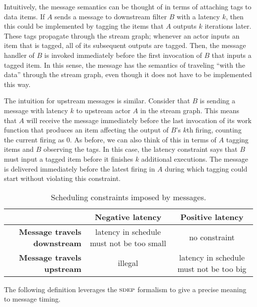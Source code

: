 Intuitively, the message semantics can be thought of in terms of
attaching tags to data items.  If $A$ sends a message to downstream
filter $B$ with a latency $k$, then this could be implemented by
tagging the items that $A$ outputs $k$ iterations later.  These tags
propagate through the stream graph; whenever an actor inputs an item
that is tagged, all of its subsequent outputs are tagged.  Then, the
message handler of $B$ is invoked immediately before the first
invocation of $B$ that inputs a tagged item.  In this sense, the
message has the semantics of traveling ``with the data'' through the
stream graph, even though it does not have to be implemented this way.

The intuition for upstream messages is similar.  Consider that $B$ is
sending a message with latency $k$ to upstream actor $A$ in the stream
graph.  This means that $A$ will receive the message immediately
before the last invocation of its work function that produces an item
affecting the output of $B$'s $k$th firing, counting the current
firing as 0.  As before, we can also think of this in terms of $A$
tagging items and $B$ observing the tags.  In this case, the latency
constraint says that $B$ must input a tagged item before it finishes
$k$ additional executions.  The message is delivered immediately
before the latest firing in $A$ during which tagging could start
without violating this constraint.

\begin{table*}[t]
\begin{center}
{\small
\begin{tabular}{|r|c|c|} \hline
~ & {\bf Negative latency} & {\bf Positive latency} \\ \hline
{\bf Message travels downstream} & latency in schedule must not be too small & no constraint \\ \hline
{\bf Message travels upstream} & illegal & latency in schedule must not be too big \\ \hline
\end{tabular}}
\caption{\small Scheduling constraints imposed by messages.}
\label{tab:messcons}
\end{center}
\vspace{-12pt}
\end{table*}

The following definition leverages the $\textsc{sdep}$ formalism to give a
precise meaning to message timing.

